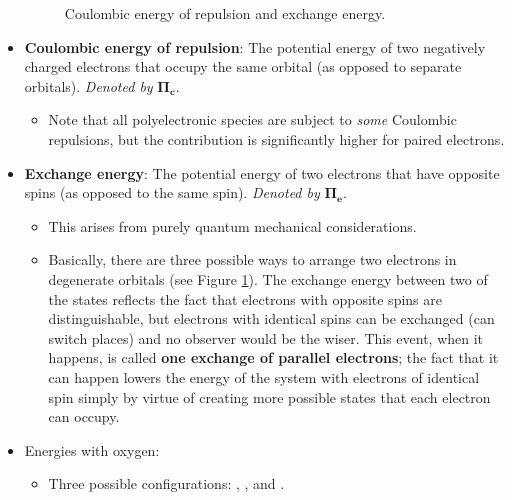 \documentclass[../main.tex]{subfiles}
\begin{document}
\begin{itemize}
\begin{figure}[H]
        \caption{Coulombic energy of repulsion and exchange energy.}
        \label{fig:coulombExchange}
    \end{figure}
    \item \textbf{Coulombic energy of repulsion}: The potential energy of two negatively charged electrons that occupy the same orbital (as opposed to separate orbitals). \emph{Denoted by} $\bm{\Pi_c}$.
    \begin{itemize}
        \item Note that all polyelectronic species are subject to \emph{some} Coulombic repulsions, but the contribution is significantly higher for paired electrons.
    \end{itemize}
    \item \textbf{Exchange energy}: The potential energy of two electrons that have opposite spins (as opposed to the same spin). \emph{Denoted by} $\bm{\Pi_e}$.
    \begin{itemize}
        \item This arises from purely quantum mechanical considerations.
        \item Basically, there are three possible ways to arrange two electrons in degenerate orbitals (see Figure \ref{fig:coulombExchange}). The exchange energy between two of the states reflects the fact that electrons with opposite spins are distinguishable, but electrons with identical spins can be exchanged (can switch places) and no observer would be the wiser. This event, when it happens, is called \textbf{one exchange of parallel electrons}; the fact that it can happen lowers the energy of the system with electrons of identical spin simply by virtue of creating more possible states that each electron can occupy.
    \end{itemize}
    \item {}Energies with oxygen:
    \begin{itemize}
        \item Three possible configurations: , , and .

\end{itemize}
\end{itemize}
\end{document}
